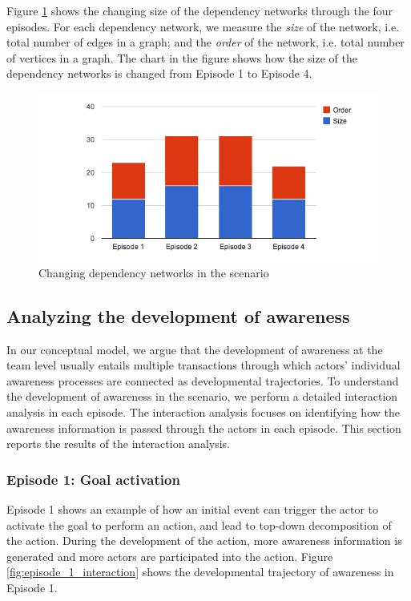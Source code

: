 Figure \ref{fig:dynamics_of_dependencies} shows the changing size of the dependency networks through the four episodes. For each dependency network, we measure the \emph{size} of the network, i.e. total number of edges in a graph; and the \emph{order} of the network, i.e. total number of vertices in a graph. The chart in the figure shows how the size of the dependency networks is changed from Episode 1 to Episode 4.

\begin{figure}[htbp] %
	\centering
	\includegraphics[width=5.8in]{dynamics_of_dependencies.jpg} 
	\caption{Changing dependency networks in the scenario}
	\label{fig:dynamics_of_dependencies}
\end{figure}

\subsection{Analyzing the development of awareness} %
\label{sub:analyzing_the_development_of_awareness_}
In our conceptual model, we argue that the development of awareness at the team level usually entails multiple transactions through which actors’ individual awareness processes are connected as developmental trajectories. To understand the development of awareness in the scenario, we perform a detailed interaction analysis in each episode. The interaction analysis focuses on identifying how the awareness information is passed through the actors in each episode. This section reports the results of the interaction analysis.

\subsubsection{Episode 1: Goal activation} %
\label{ssub:episode_1_goal_activation}
 Episode 1 shows an example of how an initial event can trigger the actor to activate the goal to perform an action, and lead to top-down decomposition of the action. During the development of the action, more awareness information is generated and more actors are participated into the action. Figure \ref{fig:episode_1_interaction} shows the developmental trajectory of awareness in Episode 1.

